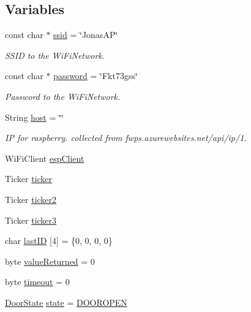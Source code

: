 \subsection*{Variables}
\begin{DoxyCompactItemize}
\item 
const char $\ast$ \mbox{\hyperlink{_hodoor_8ino_a587ba0cb07f02913598610049a3bbb79}{ssid}} = \char`\"{}Jonas\+AP\char`\"{}
\begin{DoxyCompactList}\small\item\em S\+S\+ID to the Wi\+Fi\+Network. \end{DoxyCompactList}\item 
const char $\ast$ \mbox{\hyperlink{_hodoor_8ino_aa4a2ebcb494493f648ae1e6975672575}{password}} = \char`\"{}Fkt73gss\char`\"{}
\begin{DoxyCompactList}\small\item\em Password to the Wi\+Fi\+Network. \end{DoxyCompactList}\item 
String \mbox{\hyperlink{_hodoor_8ino_a2502b12b30261ef4dea2ff97a6b78cab}{host}} = \char`\"{}\char`\"{}
\begin{DoxyCompactList}\small\item\em IP for raspberry. collected from fwps.\+azurewebsites.\+net/api/ip/1. \end{DoxyCompactList}\item 
Wi\+Fi\+Client \mbox{\hyperlink{_hodoor_8ino_abd77e757e4b3bb6f1e4b42b21ea9e040}{esp\+Client}}
\item 
Ticker \mbox{\hyperlink{_hodoor_8ino_a4bb2542b2738619fdf76b685b10e315d}{ticker}}
\item 
Ticker \mbox{\hyperlink{_hodoor_8ino_ac897bdb69e388d25c44452966489a9c0}{ticker2}}
\item 
Ticker \mbox{\hyperlink{_hodoor_8ino_ac954b19255c9b0503807c1487a6b37e8}{ticker3}}
\item 
char \mbox{\hyperlink{_hodoor_8ino_a1e3c969869954f5a43ca5bb4a7209ad9}{last\+ID}} \mbox{[}4\mbox{]} = \{0, 0, 0, 0\}
\item 
byte \mbox{\hyperlink{_hodoor_8ino_ac22a0d46d5b9a804560f46b8a3e219d0}{value\+Returned}} = 0
\item 
byte \mbox{\hyperlink{_hodoor_8ino_a190531d86dfe4b60f4a36c36dccc7399}{timeout}} = 0
\item 
\mbox{\hyperlink{_hodoor_8ino_a117f8df7c03b73093e6da94ae41b4252}{Door\+State}} \mbox{\hyperlink{_hodoor_8ino_a8159095f9d2ebca4cde1f98efbda59bf}{state}} = \mbox{\hyperlink{_hodoor_8ino_a117f8df7c03b73093e6da94ae41b4252a18cd602003cbe103c9e4c31b1457bb36}{D\+O\+O\+R\+O\+P\+EN}}
\end{DoxyCompactItemize}


